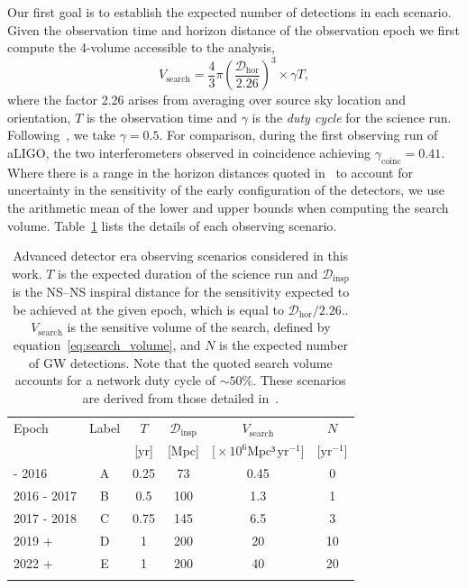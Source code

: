\documentclass[twocolumn,nofootinbib]{revtex4-1}
\newcommand{\ee}[1]{\ensuremath{\!\times\!10^{#1}}}
\newcommand{\dhor}{\ensuremath{{\mathcal D}_{\mathrm{hor}}}}
\newcommand{\dinsp}{\ensuremath{{\mathcal D}_{\mathrm{insp}}}}
\newcommand{\mpc}{\mathrm{Mpc}}
\newcommand{\yr}{\mathrm{yr}}
\newcommand{\BNS}{\ac{NS}--\ac{NS}\xspace}
\begin{document}
Our first goal is to establish the expected number of detections in
each scenario.  Given the observation time and horizon distance of the
observation epoch we first compute the 4-volume accessible to the
analysis,
%
\begin{equation}
    \label{eq:search_volume}
    V_{\mathrm{search}} = \frac{4}{3}\pi \left(\frac{\dhor}{2.26}\right)^3 \times \gamma T,
\end{equation}
%
where the factor 2.26 arises from averaging over source sky location
and orientation, $T$ is the observation time and $\gamma$ is the
\emph{duty cycle} for the science run.  Following~\cite{Aasi:2013wya},
we take $\gamma=0.5$.  For comparison, during the first observing run
of \ac{aLIGO}, the two interferometers observed in coincidence
achieving $\gamma_{\mathrm{coinc}} = 0.41$.  Where there is a range in
the horizon distances quoted in~\cite{Aasi:2013wya} to account for
uncertainty in the sensitivity of the early configuration of the
detectors, we use the arithmetic mean of the lower and upper bounds
when computing the search volume.  Table~\ref{tab:scenarios} lists
the details of each observing scenario.
%
\begin{table}
\centering
\begin{tabular}{lccccc}
  \toprule
  Epoch & Label & $T$ & \dinsp & $V_{\mathrm{search}}$ & $N$ \\
        &       & [yr] & [Mpc] & [$\ee{6} \mpc³\,\yr^{-1}$] & [$\yr^{-1}$] \\
  \colrule
  2015 - 2016 &A& 0.25 & 73 & 0.45 & 0 \\
  2016 - 2017 &B& 0.5 & 100 & 1.3 & 1\\
  2017 - 2018 &C& 0.75 & 145 & 6.5 & 3\\
  2019 +      &D& 1    & 200 & 20 & 10\\
  2022 +      &E& 1    & 200 & 40 & 20\\
  \botrule
\end{tabular}
\caption{Advanced detector era observing scenarios considered in this
  work.  $T$ is the expected duration of the science run and $\dinsp$
  is the \BNS inspiral distance for the sensitivity expected to be
  achieved at the given epoch, which is equal to $\dhor / 2.26$..
  $V_{\mathrm{search}}$ is the sensitive volume of the search, defined
  by equation~\ref{eq:search_volume}, and $N$ is the expected number
  of \ac{GW} detections.  Note that the quoted search volume accounts
  for a network duty cycle of $\sim 50\%$.  These scenarios are
  derived from those detailed in~\cite{Aasi:2013wya}.
    \label{tab:scenarios}}
\end{table}
%
\end{document}

